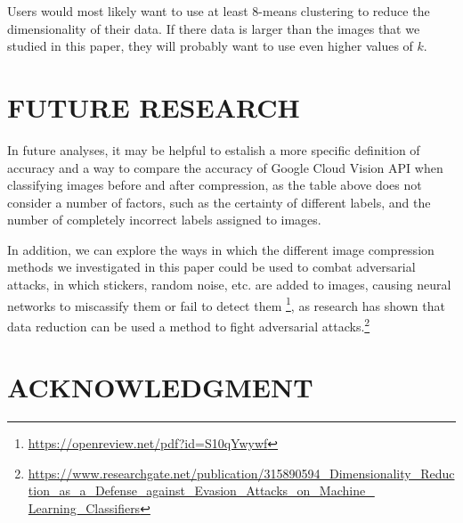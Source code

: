 \documentclass[letterpaper, 12 pt, conference]{ieeeconf}  %
\begin{document}
Users would most likely want to use at least 8-means clustering
to reduce the dimensionality of their data.
If there data is larger than the images that we studied in this paper,
they will probably want to use even higher values of $k$.

\section{FUTURE RESEARCH}

In future analyses, it may be helpful to estalish a more
specific definition of accuracy and a way to compare
the accuracy of Google Cloud Vision API when classifying
images before and after compression, as the table
above does not consider a number of factors, such as
the certainty of different labels, and the number
of completely incorrect labels assigned to images.

In addition, we can explore the ways in which the different
image compression methods we investigated in this paper
could be used to combat adversarial attacks, in which
stickers, random noise, etc. are added to images, causing
neural networks to miscassify them or fail to detect them
\footnote{\url{https://openreview.net/pdf?id=S10qYwywf}},
as research has shown that data reduction can be used a method to fight
adversarial attacks.\footnote{\url{https://www.researchgate.net/publication/315890594\_Dimensionality\_Reduction\_as\_a\_Defense\_against\_Evasion\_Attacks\_on\_Machine\_ Learning\_Classifiers}}


\addtolength{\textheight}{-12cm}   %


\section*{ACKNOWLEDGMENT}
\end{document}
